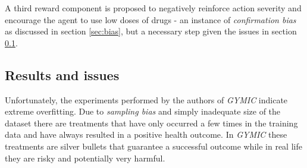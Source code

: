 A third reward component is proposed to negatively reinforce action severity and encourage the agent to use low doses of drugs - an instance of \emph{confirmation bias} as discussed in section \ref{sec:bias}, but a necessary step given the issues in section \ref{sec:gymic-results}.

\subsection{Results and issues}
\label{sec:gymic-results}

Unfortunately, the experiments performed by the authors of \emph{GYMIC} indicate extreme overfitting.
Due to \emph{sampling bias} and simply inadequate size of the dataset there are treatments that have only occurred a few times in the training data and have always resulted in a positive health outcome.
In \emph{GYMIC} these treatments are silver bullets that guarantee a successful outcome while in real life they are risky and potentially very harmful.